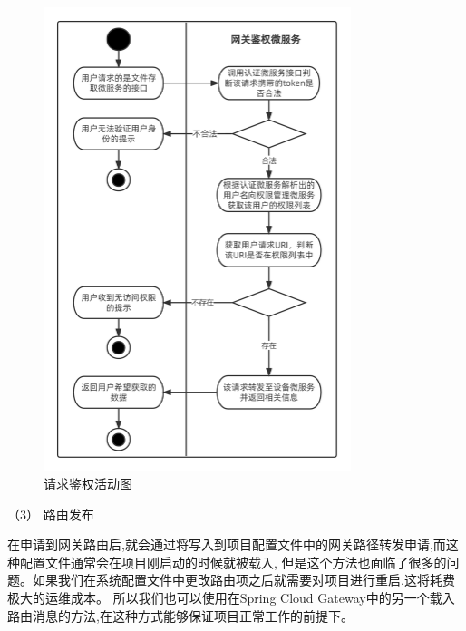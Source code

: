 \begin{figure}[htb]
    \centering
    \includegraphics[width=0.8\textwidth]{my_figures/chapter4/请求鉴权活动图.png}
    \caption{请求鉴权活动图}
    \label{fig:请求鉴权活动图}
\end{figure}

（3） 路由发布


在申请到网关路由后,就会通过将写入到项目配置文件中的网关路径转发申请,而这种配置文件通常会在项目刚启动的时候就被载入,
但是这个方法也面临了很多的问题。如果我们在系统配置文件中更改路由项之后就需要对项目进行重启,这将耗费极大的运维成本。
所以我们也可以使用在Spring Cloud Gateway中的另一个载入路由消息的方法,在这种方式能够保证项目正常工作的前提下。

